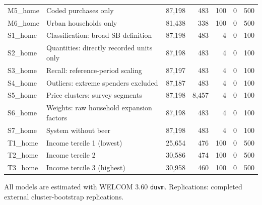 \begin{table}[!htbp]
\begin{threeparttable}
\begin{tabular}{lp{5.2cm}rrrrr}
M5\_home & Coded purchases only & 87,198 & 483 & 100 & 0 & 500 \\
M6\_home & Urban households only & 81,438 & 338 & 100 & 0 & 500 \\
S1\_home & Classification: broad SB definition & 87,198 & 483 & 4 & 0 & 100 \\
S2\_home & Quantities: directly recorded units only & 87,198 & 483 & 4 & 0 & 100 \\
S3\_home & Recall: reference-period scaling & 87,197 & 483 & 4 & 0 & 100 \\
S4\_home & Outliers: extreme spenders excluded & 87,187 & 483 & 4 & 0 & 100 \\
S5\_home & Price clusters: survey segments & 87,198 & 8,457 & 4 & 0 & 100 \\
S6\_home & Weights: raw household expansion factors & 87,198 & 483 & 4 & 0 & 100 \\
S7\_home & System without beer & 87,198 & 483 & 4 & 0 & 100 \\
T1\_home & Income tercile 1 (lowest) & 25,654 & 476 & 100 & 0 & 500 \\
T2\_home & Income tercile 2 & 30,586 & 474 & 100 & 0 & 500 \\
T3\_home & Income tercile 3 (highest) & 30,958 & 460 & 100 & 0 & 500 \\
\bottomrule
\end{tabular}
\begin{tablenotes}[flushleft]
\footnotesize
\item All models are estimated with WELCOM 3.60 \texttt{duvm}. Replications: completed external cluster-bootstrap replications.
\end{tablenotes}
\end{threeparttable}
\end{table}
